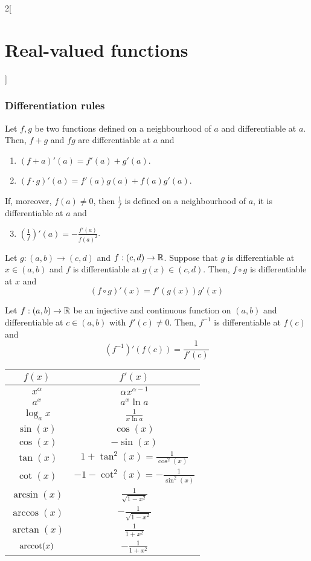 \documentclass[../../../main.tex]{subfiles}
\begin{document}
\begin{multicols}{2}[\section{Real-valued functions}]
\subsubsection*{Differentiation rules}
\begin{prop}
    Let $f,g$ be two functions defined on a neighbourhood of $a$ and differentiable at $a$. Then, $f+g$ and $fg$ are differentiable at $a$ and
    \begin{enumerate}
        \item $(f+a)'(a)=f'(a)+g'(a)$.
        \item $(f\cdot g)'(a)=f'(a)g(a)+f(a)g'(a)$.
    \end{enumerate}
    If, moreover, $f(a)\ne 0$, then $\frac{1}{f}$ is defined on a neighbourhood of $a$, it is differentiable at $a$ and 
    \begin{enumerate}\setcounter{enumi}{2}
        \item $\displaystyle\left(\frac{1}{f}\right)'(a)=-\frac{f'(a)}{{f(a)}^2}$.
    \end{enumerate}
\end{prop}
\begin{prop}
    Let $g:(a,b)\rightarrow(c,d)$ and $f:(c,d)\rightarrow\mathbb{R}$. Suppose that $g$ is differentiable at $x\in(a,b)$ and $f$ is differentiable at $g(x)\in(c,d)$. Then, $f\circ g$ is differentiable at $x$ and $$(f\circ g)'(x)=f'(g(x))g'(x)$$
\end{prop}
\begin{prop}
    Let $f:(a,b)\rightarrow\mathbb{R}$ be an injective and continuous function on $(a,b)$ and differentiable at $c\in(a,b)$ with $f'(c)\ne 0$. Then, $f^{-1}$ is differentiable at $f(c)$ and $$(f^{-1})'(f(c))=\frac{1}{f'(c)}$$
\end{prop}
\begin{center}
    \renewcommand{\arraystretch}{1.5}
    \begin{tabular}{|c|c|}
        \hline
        $f(x)$ & $f'(x)$ \\
        \hline
        $x^\alpha$ & $\alpha x^{\alpha-1}$ \\
        $a^x$ & $a^x\ln a$ \\
        $\log_a x$ & $\displaystyle \frac{1}{x\ln a}$ \\
        $\sin(x)$ & $\cos(x)$ \\
        $\cos(x)$ & $-\sin(x)$ \\
        $\tan(x)$ & $\displaystyle 1+\tan^2(x)=\frac{1}{\cos^2(x)}$ \\
        $\cot(x)$ & $\displaystyle -1-\cot^2(x)=-\frac{1}{\sin^2(x)}$ \\
        $\arcsin(x)$ & $\displaystyle \frac{1}{\sqrt{1-x^2}}$ \\
        $\arccos(x)$ & $\displaystyle -\frac{1}{\sqrt{1-x^2}}$ \\
        $\arctan(x)$ & $\displaystyle \frac{1}{1+x^2}$ \\
        $\arccot(x)$ & $\displaystyle -\frac{1}{1+x^2}$ \\
        \hline
    \end{tabular}
\end{center}

\end{multicols}
\end{document}
